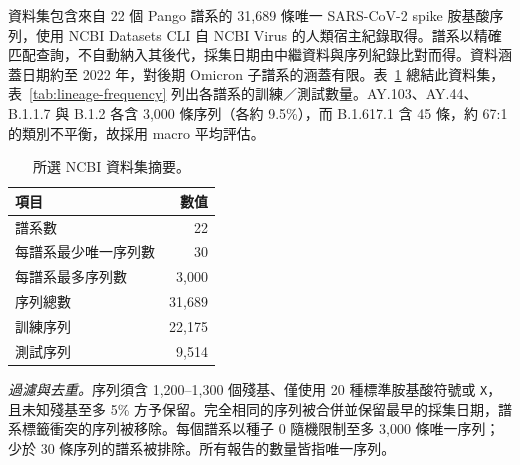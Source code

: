 \documentclass[10pt,a4paper]{article}
\begin{document}
資料集包含來自 22 個 Pango 譜系的 31,689 條唯一 SARS-CoV-2 spike 胺基酸序列，使用 NCBI Datasets CLI 自 NCBI Virus 的人類宿主紀錄取得。譜系以精確匹配查詢，不自動納入其後代，採集日期由中繼資料與序列紀錄比對而得。資料涵蓋日期約至 2022 年，對後期 Omicron 子譜系的涵蓋有限。表~\ref{tab:dataset-summary} 總結此資料集，表~\ref{tab:lineage-frequency} 列出各譜系的訓練／測試數量。AY.103、AY.44、B.1.1.7 與 B.1.2 各含 3,000 條序列（各約 9.5\%），而 B.1.617.1 含 45 條，約 67:1 的類別不平衡，故採用 macro 平均評估。

\begin{table}[ht]
    \centering
    \caption{所選 NCBI 資料集摘要。}
    \label{tab:dataset-summary}
    \footnotesize
    \setlength{\tabcolsep}{6pt}
    \renewcommand{\arraystretch}{1.2}
    \begin{tabular*}{0.48\textwidth}{@{\extracolsep{\fill}}lr@{}}
        \toprule
        項目 & 數值 \\
        \midrule
        譜系數 & 22 \\
        每譜系最少唯一序列數 & 30 \\
        每譜系最多序列數 & 3,000 \\
        序列總數 & 31,689 \\
        訓練序列 & 22,175 \\
        測試序列 & 9,514 \\
        \bottomrule
    \end{tabular*}
\end{table}

\textit{過濾與去重。}序列須含 1,200--1,300 個殘基、僅使用 20 種標準胺基酸符號或 \texttt{X}，且未知殘基至多 5\% 方予保留。完全相同的序列被合併並保留最早的採集日期，譜系標籤衝突的序列被移除。每個譜系以種子 0 隨機限制至多 3,000 條唯一序列；少於 30 條序列的譜系被排除。所有報告的數量皆指唯一序列。
\end{document}
